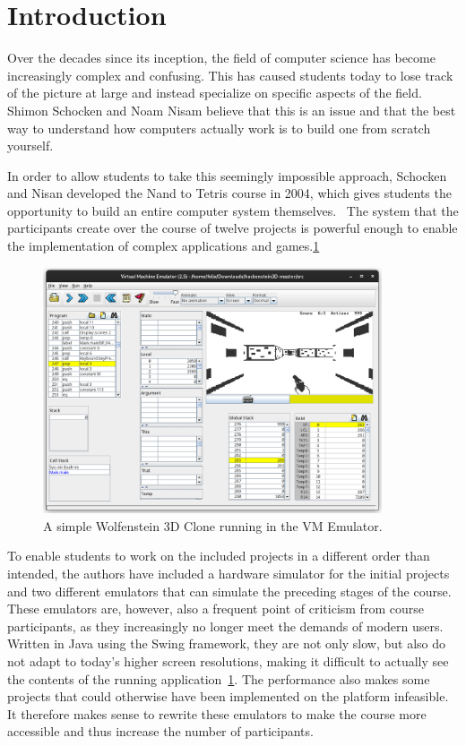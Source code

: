 \section{Introduction}
Over the decades since its inception, the field of computer science has become increasingly complex and confusing.
This has caused students today to lose track of the picture at large and instead specialize on specific aspects of the field.
Shimon Schocken and Noam Nisam believe that this is an issue and that the best way to understand how computers actually work is to build one from scratch yourself.~\cite[Preface]{nisan2005}

In order to allow students to take this seemingly impossible approach, Schocken and Nisan developed the Nand to Tetris course in 2004, which gives students the opportunity to build an entire computer system themselves.~\cite{1408798}
The system that the participants create over the course of twelve projects is powerful enough to enable the implementation of complex applications and games.\ref{fig:hackenstein-official}

\begin{center}
  \begin{figure}[ht]
    \centering
    \includegraphics[width=10cm]{fig/hackenstein-official.png}
    \caption{A simple Wolfenstein 3D Clone running in the VM Emulator.}%
    \label{fig:hackenstein-official}
  \end{figure}
\end{center}

To enable students to work on the included projects in a different order than intended, the authors have included a hardware simulator for the initial projects and two different emulators that can simulate the preceding stages of the course.
These emulators are, however, also a frequent point of criticism from course participants, as they increasingly no longer meet the demands of modern users.
Written in Java using the Swing framework, they are not only slow, but also do not adapt to today's higher screen resolutions, making it difficult to actually see the contents of the running application~\ref{fig:hackenstein-official}.
The performance also makes some projects that could otherwise have been implemented on the platform infeasible.
It therefore makes sense to rewrite these emulators to make the course more accessible and thus increase the number of participants.

